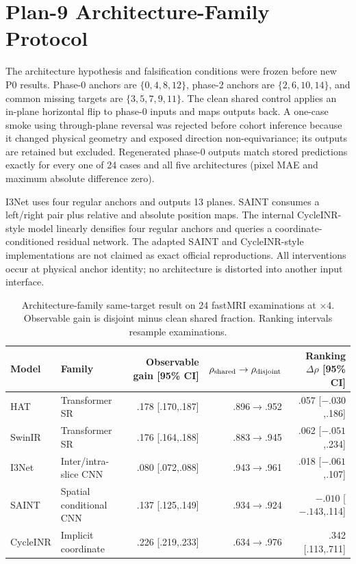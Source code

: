 \documentclass[10pt,twocolumn,letterpaper]{article}
\begin{document}
\section{Plan-9 Architecture-Family Protocol}
The architecture hypothesis and falsification conditions were frozen before new P0 results. Phase-0 anchors are $\{0,4,8,12\}$, phase-2 anchors are $\{2,6,10,14\}$, and common missing targets are $\{3,5,7,9,11\}$. The clean shared control applies an in-plane horizontal flip to phase-0 inputs and maps outputs back. A one-case smoke using through-plane reversal was rejected before cohort inference because it changed physical geometry and exposed direction non-equivariance; its outputs are retained but excluded. Regenerated phase-0 outputs match stored predictions exactly for every one of 24 cases and all five architectures (pixel MAE and maximum absolute difference zero).

I3Net uses four regular anchors and outputs 13 planes. SAINT consumes a left/right pair plus relative and absolute position maps. The internal CycleINR-style model linearly densifies four regular anchors and queries a coordinate-conditioned residual network. The adapted SAINT and CycleINR-style implementations are not claimed as exact official reproductions. All interventions occur at physical anchor identity; no architecture is distorted into another input interface.

\begin{table}[t]
\centering
\caption{Architecture-family same-target result on 24 fastMRI examinations at $\times4$. Observable gain is disjoint minus clean shared fraction. Ranking intervals resample examinations.}
\label{tab:p9-arch}
\setlength{\tabcolsep}{4pt}
\begin{tabular}{llrrr}
\toprule
Model & Family & Observable gain [95\% CI] & $\rho_{\rm shared}\rightarrow\rho_{\rm disjoint}$ & Ranking $\Delta\rho$ [95\% CI]\\
\midrule
HAT & Transformer SR & .178 [.170,.187] & .896$\rightarrow$.952 & .057 [$-.030$,.186]\\
SwinIR & Transformer SR & .176 [.164,.188] & .883$\rightarrow$.945 & .062 [$-.051$,.234]\\
I3Net & Inter/intra-slice CNN & .080 [.072,.088] & .943$\rightarrow$.961 & .018 [$-.061$,.107]\\
SAINT & Spatial conditional CNN & .137 [.125,.149] & .934$\rightarrow$.924 & $-.010$ [$-.143$,.114]\\
CycleINR & Implicit coordinate & .226 [.219,.233] & .634$\rightarrow$.976 & .342 [.113,.711]\\
\bottomrule
\end{tabular}
\end{table}
\end{document}
